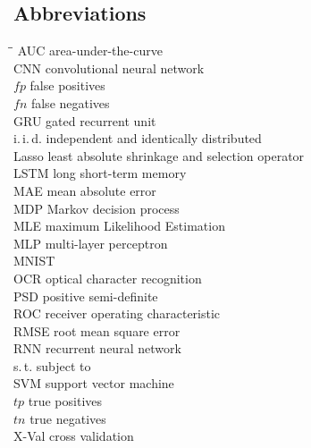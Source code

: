 \documentclass[12pt]{article}
\begin{document}
\subsection*{Abbreviations}

\begin{tabbing}
	\hspace*{2mm}\=\hspace*{4.15cm}\=\kill
	\> AUC										\>	area-under-the-curve									\\[3mm]
	\> CNN										\>	convolutional neural network								\\[3mm]
	\> $fp$										\>	false positives										\\[3mm]
	\> $fn$										\>	false negatives										\\[3mm]
	\> GRU										\>	gated recurrent unit									\\[3mm]
	\> i.\,i.\,d.										\>	independent and identically distributed						\\[3mm]
	\> Lasso										\>	least absolute shrinkage and selection operator				\\[3mm]
	\> LSTM										\>	long short-term memory								\\[3mm]
	\> MAE										\>	mean absolute error									\\[3mm]
	\> MDP										\>	Markov decision process								\\[3mm]
	\> MLE										\>	maximum Likelihood Estimation							\\[3mm]
	\> MLP										\>	multi-layer perceptron									\\[3mm]
	\> MNIST										\>													\\[3mm]
	\> OCR										\>	optical character recognition								\\[3mm]
	\> PSD										\>	positive semi-definite									\\[3mm]
	\> ROC										\>	receiver operating characteristic							\\[3mm]
	\> RMSE										\>	root mean square error									\\[3mm]
	\> RNN										\>	recurrent neural network								\\[3mm]
	\> s.\,t.										\>	subject to											\\[3mm]
	\> SVM										\>	support vector machine								\\[3mm]
	\> $tp$										\>	true positives										\\[3mm]
	\> $tn$										\>	true negatives										\\[3mm]
	\> X-Val										\>	cross validation
\end{tabbing}
\end{document}
